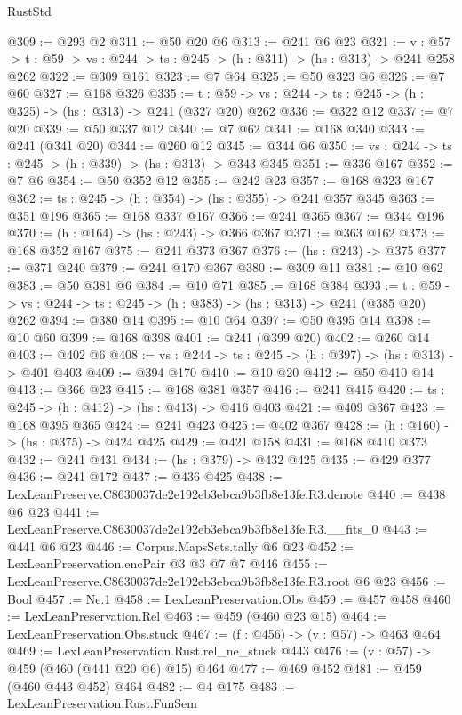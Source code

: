 \begin{lexlean}{RustStd}
\begin{coremodule}
@309 := @293 @2
@311 := @50 @20 @6
@313 := @241 @6 @23
@321 := {v : @57} ->
  {t : @59} -> {vs : @244} -> {ts : @245} -> (h : @311) -> (hs : @313) -> @241 @258 @262
@322 := @309 @161
@323 := @7 @64
@325 := @50 @323 @6
@326 := @7 @60
@327 := @168 @326
@335 := {t : @59} -> {vs : @244} -> {ts : @245} -> (h : @325) -> (hs : @313) -> @241 (@327 @20) @262
@336 := @322 @12
@337 := @7 @20
@339 := @50 @337 @12
@340 := @7 @62
@341 := @168 @340
@343 := @241 (@341 @20)
@344 := @260 @12
@345 := @344 @6
@350 := {vs : @244} -> {ts : @245} -> (h : @339) -> (hs : @313) -> @343 @345
@351 := @336 @167
@352 := @7 @6
@354 := @50 @352 @12
@355 := @242 @23
@357 := @168 @323 @167
@362 := {ts : @245} -> (h : @354) -> (hs : @355) -> @241 @357 @345
@363 := @351 @196
@365 := @168 @337 @167
@366 := @241 @365
@367 := @344 @196
@370 := (h : @164) -> (hs : @243) -> @366 @367
@371 := @363 @162
@373 := @168 @352 @167
@375 := @241 @373 @367
@376 := (hs : @243) -> @375
@377 := @371 @240
@379 := @241 @170 @367
@380 := @309 @11
@381 := @10 @62
@383 := @50 @381 @6
@384 := @10 @71
@385 := @168 @384
@393 := {t : @59} -> {vs : @244} -> {ts : @245} -> (h : @383) -> (hs : @313) -> @241 (@385 @20) @262
@394 := @380 @14
@395 := @10 @64
@397 := @50 @395 @14
@398 := @10 @60
@399 := @168 @398
@401 := @241 (@399 @20)
@402 := @260 @14
@403 := @402 @6
@408 := {vs : @244} -> {ts : @245} -> (h : @397) -> (hs : @313) -> @401 @403
@409 := @394 @170
@410 := @10 @20
@412 := @50 @410 @14
@413 := @366 @23
@415 := @168 @381 @357
@416 := @241 @415
@420 := {ts : @245} -> (h : @412) -> (hs : @413) -> @416 @403
@421 := @409 @367
@423 := @168 @395 @365
@424 := @241 @423
@425 := @402 @367
@428 := (h : @160) -> (hs : @375) -> @424 @425
@429 := @421 @158
@431 := @168 @410 @373
@432 := @241 @431
@434 := (hs : @379) -> @432 @425
@435 := @429 @377
@436 := @241 @172
@437 := @436 @425
@438 := LexLeanPreserve.C8630037de2e192eb3ebca9b3fb8e13fe.R3.denote
@440 := @438 @6 @23
@441 := LexLeanPreserve.C8630037de2e192eb3ebca9b3fb8e13fe.R3.__fits_0
@443 := @441 @6 @23
@446 := Corpus.MapsSets.tally @6 @23
@452 := LexLeanPreservation.encPair @3 @3 @7 @7 @446
@455 := LexLeanPreserve.C8630037de2e192eb3ebca9b3fb8e13fe.R3.root @6 @23
@456 := Bool
@457 := Ne.{1}
@458 := LexLeanPreservation.Obs
@459 := @457 @458
@460 := LexLeanPreservation.Rel
@463 := @459 (@460 @23 @15)
@464 := LexLeanPreservation.Obs.stuck
@467 := (f : @456) -> (v : @57) -> @463 @464
@469 := LexLeanPreservation.Rust.rel_ne_stuck @443
@476 := (v : @57) -> @459 (@460 (@441 @20 @6) @15) @464
@477 := @469 @452
@481 := @459 (@460 @443 @452) @464
@482 := @4 @175
@483 := LexLeanPreservation.Rust.FunSem

\end{coremodule}
\end{lexlean}
